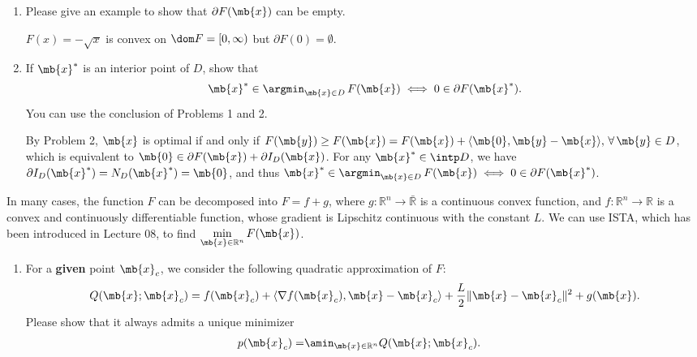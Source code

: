\begin{exercise}
\begin{enumerate}
        \item Please give an example to show that $\partial F(\mb{x})$ can be empty.

            \begin{solution}
                $F(x) = -\sqrt{x}$ is convex on $\dom F = [0,\infty)$ but $\partial F(0) = \emptyset$.
            \end{solution}
        \item If $\mb{x}^*$ is an interior point of $D$, show that
            \begin{align*}
                \mb{x}^*\in\argmin_{\mb{x}\in D}\,F(\mb{x})\iff 0\in\partial F(\mb{x}^*).
            \end{align*}
            You can use the conclusion of Problems 1 and 2.

            \begin{solution}

                By Problem 2, $\mb{x}$ is optimal if and only if $F(\mb{y}) \ge F(\mb{x}) = F(\mb{x}) + \langle \mb{0},\mb{y}-\mb{x} \rangle ,\, \forall\, \mb{y}\in D$, which is equivalent to $\mb{0}\in\partial F(\mb{x}) + \partial I_D(\mb{x})$. For any $\mb{x}^* \in \intp D$, we have $\partial I_D(\mb{x}^*) = N_{D}(\mb{x}^*) = \mb{0}$, and thus $\mb{x}^*\in\argmin_{\mb{x}\in D}\,F(\mb{x})\iff 0\in\partial F(\mb{x}^*)$.
            \end{solution}
    \end{enumerate}
    In many cases, the function $F$ can be decomposed into $F=f+g$,
    where $g:\mathbb{R}^n\to\bar{\mathbb{R}}$ is a continuous convex function, and $f:\mathbb{R}^n\to\mathbb{R}$ is a convex and continuously differentiable function, whose gradient is Lipschitz continuous with the constant $L$.
    We can use ISTA, which has been introduced in Lecture 08, to find $\min\limits_{\mb{x}\in\mathbb{R}^n} F(\mb{x})$.

    \begin{enumerate}[resume]
        \item For a \textbf{given} point $\mb{x}_c$, we consider the following quadratic approximation of $F$:
            \begin{align*}
                Q(\mb{x};\mb{x}_c)=f(\mb{x}_c)+\langle\nabla f(\mb{x}_c),\mb{x}-\mb{x}_c\rangle+\frac{L}{2}\|\mb{x}-\mb{x}_c\|^2+g(\mb{x}).
            \end{align*}
            Please show that it always admits a unique minimizer
            \begin{align*}
                p(\mb{x}_c)= & \amin_{\mb{x}\in\mathbb{R}^n}Q(\mb{x};\mb{x}_c).
            \end{align*}


\end{enumerate}
\end{exercise}
